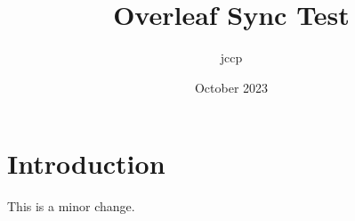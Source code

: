 \documentclass{article}
\title{Overleaf Sync Test}
\author{jccp }
\date{October 2023}
\begin{document}
\maketitle

\section{Introduction}

This is a minor change.
\end{document}
